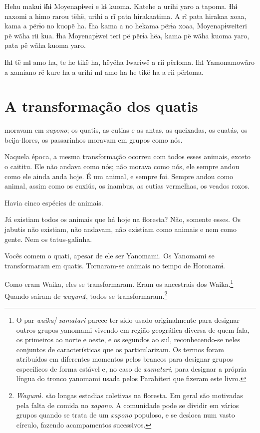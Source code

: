 Hehu makui ɨ̃hɨ Moyenapɨwei e kɨ kuoma. Katehe a urihi yaro a tapoma. Ɨhɨ
naxomi a himo rarou tëhë, urihi a rĩ pata hirakaatima. A rĩ pata hirakaa
xoaa, kama a përɨo no kuopë ha. Ɨha kama a no hekama përɨa xoaa,
Moyenapɨweiteri pë wãha rii kua. Ɨha Moyenapɨwei teri pë përɨa hëa, kama
pë wãha kuoma yaro, pata pë wãha kuoma yaro. 

Ɨhɨ të mɨ amo ha, te he tikë ha, hëyëha Iwariwë a rii përɨoma. Ɨhɨ
Yamonamowãro a xamiano rë kure ha a urihi mɨ amo ha he tikë ha a rii
përɨoma. 

 
\chapter{A transformação dos quatis}

 moravam em \textit{xapono}; os quatis, as cutias e as antas, as
queixadas, os cuatás, os beija-flores, os passarinhos moravam em grupos
como nós.

Naquela época, a mesma transformação ocorreu com todos esses animais,
exceto o caititu. Ele não andava como nós; não morava como nós, ele
sempre andou como ele ainda anda hoje. É um animal, e sempre foi. Sempre
andou como animal, assim como os cuxiús, os inambus, as cutias
vermelhas, os veados roxos.

Havia cinco espécies de animais. 

Já existiam todos os animais que há hoje na floresta? Não, somente
esses. Os jabutis não existiam, não andavam, não existiam como animais e
nem como gente. Nem os tatus-galinha. 

Vocês comem o quati, apesar de ele ser Yanomami. Os Yanomami se
transformaram em quatis. Tornaram-se animais no tempo de Horonamɨ. 

Como eram Waika, eles se transformaram. Eram os ancestrais dos Waika.\footnote{O par \textit{waika}/\,\textit{xamatari} parece ter sido usado originalmente para designar outros grupos yanomami vivendo em região geográfica diversa de quem fala, os primeiros ao norte e oeste, e os segundos ao sul, reconhecendo-se neles conjuntos de características que os particularizam. Os termos foram atribuídos em diferentes momentos pelos brancos para designar grupos específicos de forma estável e, no caso de \textit{xamatari}, para designar a própria língua do tronco yanomami usada pelos Parahiteri que fizeram este livro.} Quando saíram de \textit{wayumɨ}, todos se transformaram.\footnote{\textit{Wayumɨ.} são longas estadias coletivas na floresta. Em geral são motivadas pela falta de comida no \textit{xapono}. A comunidade pode se dividir em vários grupos quando se trata de um \textit{xapono} populoso, e se desloca num vasto círculo, fazendo acampamentos sucessivos.} 

